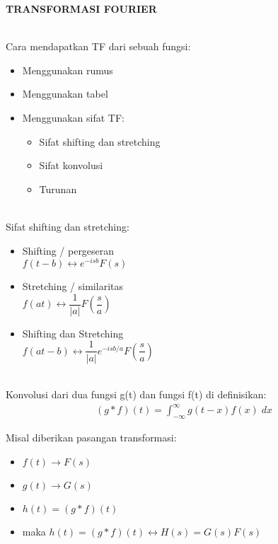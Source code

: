 \documentclass{article}
\begin{document}
\newpage
\begin{center}
    \textbf{TRANSFORMASI FOURIER}
\end{center}
\leavevmode\\

Cara mendapatkan TF dari sebuah fungsi:
\begin{itemize}
    \item Menggunakan rumus
    \item Menggunakan tabel
    \item Menggunakan sifat TF:
          \begin{itemize}
              \item Sifat shifting dan stretching
              \item Sifat konvolusi
              \item Turunan
          \end{itemize}
\end{itemize}
\leavevmode\\

Sifat shifting dan stretching:
\begin{itemize}
    \item Shifting / pergeseran \\
          $f(t - b) \leftrightarrow e^{-isb} F(s)$
    \item Stretching / similaritas \\
          $f(at) \leftrightarrow \dfrac{1}{|a|} F(\dfrac{s}{a})$
    \item Shifting dan Stretching \\
          $f(at - b) \leftrightarrow \dfrac{1}{|a|}e^{-isb/a} F(\dfrac{s}{a})$
\end{itemize}
\leavevmode\\

Konvolusi dari dua fungsi g(t) dan fungsi f(t) di definisikan:
\begin{align}
    \boxed{(g*f)(t) = \int_{- \infty}^{\infty}g(t-x)f(x)\;dx}
    \nonumber
\end{align}

Misal diberikan pasangan transformasi:
\begin{itemize}
    \item $f(t) \rightarrow F(s)$
    \item $g(t) \rightarrow G(s)$
    \item $h(t) = (g*f)(t)$
    \item maka $h(t) = (g*f)(t) \leftrightarrow H(s)=G(s)F(s)$
\end{itemize}
\leavevmode\\\\\\\\
\end{document}
